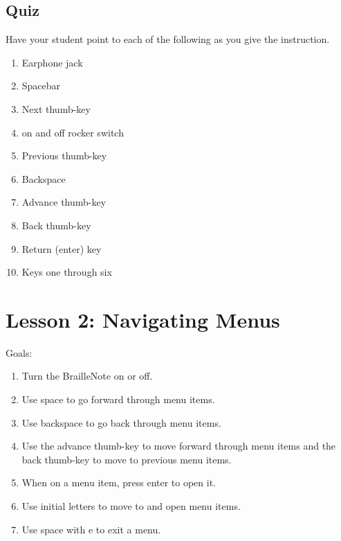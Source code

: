 \documentclass[10pt,letterpaper,twoside]{report}
\begin{document}
{{{{\subsection{Quiz}
Have your student point to each of the following as you give the instruction.

\begin{enumerate}
	\item Earphone jack
	\item Spacebar
	\item Next thumb-key
	\item on and off rocker switch
	\item Previous thumb-key
	\item Backspace
	\item Advance thumb-key
	\item Back thumb-key
	\item Return (enter) key
	\item Keys one through six
\end{enumerate}



\section*{Lesson 2: Navigating Menus}


Goals:



\begin{enumerate}
	\item Turn the BrailleNote on or off.
	      
	\item Use space to go forward through menu items.
	      
	\item Use backspace to go back through menu items.
	      
	\item Use the advance thumb-key to move forward through menu items and the back thumb-key to move to previous menu items.
	      
	\item When on a menu item, press enter to open it.
	      
	\item Use initial letters to move to and open menu items.
	      
	\item Use space with e to exit a menu.
	      

\end{enumerate}}}}}
\end{document}
